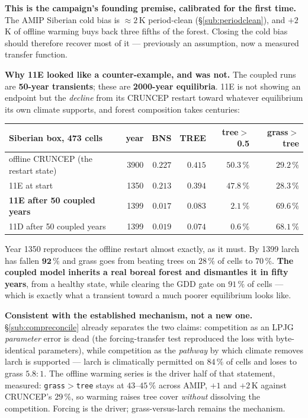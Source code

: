 \documentclass[10pt]{article}
\begin{document}
\textbf{This is the campaign's founding premise, calibrated for the first time.} The AMIP
Siberian cold bias is ${\approx}2$\,K period-clean (\S\ref{sub:periodclean}), and $+2$\,K
of offline warming buys back three fifths of the forest. Closing the cold bias should
therefore recover most of it --- previously an assumption, now a measured transfer
function.

\textbf{Why 11E looked like a counter-example, and was not.} The coupled runs are
\textbf{50-year transients}; these are \textbf{2000-year equilibria}. 11E is not showing an
endpoint but the \emph{decline} from its CRUNCEP restart toward whatever equilibrium its
own climate supports, and forest composition takes centuries:

\begin{center}\footnotesize
\begin{tabular}{l r r r r r}
\toprule
Siberian box, 473 cells & year & BNS & TREE & tree$>$0.5 & grass$>$tree \\
\midrule
offline CRUNCEP (the restart state) & 3900 & $0.227$ & $0.415$ & $50.3\,\%$ & $29.2\,\%$ \\
11E at start & 1350 & $0.213$ & $0.394$ & $47.8\,\%$ & $28.3\,\%$ \\
\textbf{11E after 50 coupled years} & 1399 & $\mathbf{0.017}$ & $\mathbf{0.083}$ & $2.1\,\%$ & $\mathbf{69.6\,\%}$ \\
11D after 50 coupled years & 1399 & $0.019$ & $0.074$ & $0.6\,\%$ & $68.1\,\%$ \\
\bottomrule
\end{tabular}
\end{center}

\noindent Year 1350 reproduces the offline restart almost exactly, as it must. By 1399
larch has fallen $\mathbf{92\,\%}$ and grass goes from beating trees on $28\,\%$ of cells to
$70\,\%$. \textbf{The coupled model inherits a real boreal forest and dismantles it in
fifty years}, from a healthy state, while clearing the GDD gate on $91\,\%$ of cells ---
which is exactly what a transient toward a much poorer equilibrium looks like.

\textbf{Consistent with the established mechanism, not a new one.} \S\ref{sub:compreconcile}
already separates the two claims: competition as an LPJG \emph{parameter} error is dead
(the forcing-transfer test reproduced the loss with byte-identical parameters), while
competition as the \emph{pathway} by which climate removes larch is supported --- larch is
climatically permitted on $84\,\%$ of cells and loses to grass $5.8\!:\!1$. The offline
warming series is the driver half of that statement, measured: \texttt{grass$>$tree} stays
at $43$--$45\,\%$ across AMIP, $+1$ and $+2$\,K against CRUNCEP's $29\,\%$, so warming
raises tree cover \emph{without} dissolving the competition. Forcing is the driver;
grass-versus-larch remains the mechanism.
\end{document}
